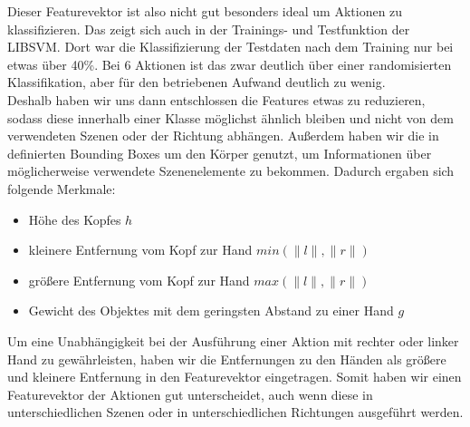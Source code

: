 Dieser Featurevektor ist also nicht gut besonders ideal um Aktionen zu klassifizieren. Das zeigt sich auch in der Trainings- und Testfunktion der LIBSVM. Dort war die Klassifizierung der Testdaten nach dem Training nur bei etwas über 40\%. Bei 6 Aktionen ist das zwar deutlich über einer randomisierten Klassifikation, aber für den betriebenen Aufwand deutlich zu wenig.\\
Deshalb haben wir uns dann entschlossen die Features etwas zu reduzieren, sodass diese innerhalb einer Klasse möglichst ähnlich bleiben und nicht von dem verwendeten Szenen oder der Richtung abhängen. Außerdem haben wir die in \cite{scene-grok} definierten Bounding Boxes um den Körper genutzt, um Informationen über möglicherweise verwendete Szenenelemente zu bekommen. Dadurch ergaben sich folgende Merkmale:
\begin{itemize}
    \item Höhe des Kopfes $h$
    \item kleinere Entfernung vom Kopf zur Hand $min(\lVert l \rVert,\lVert r \rVert)$
    \item größere Entfernung vom Kopf zur Hand $max(\lVert l \rVert,\lVert r \rVert)$
    \item Gewicht des Objektes mit dem geringsten Abstand zu einer Hand $g$
\end{itemize}
Um eine Unabhängigkeit bei der Ausführung einer Aktion mit rechter oder linker Hand zu gewährleisten, haben wir die Entfernungen zu den Händen als größere und kleinere Entfernung in den Featurevektor eingetragen. Somit haben wir einen Featurevektor der Aktionen gut unterscheidet, auch wenn diese in unterschiedlichen Szenen oder in unterschiedlichen Richtungen ausgeführt werden.

